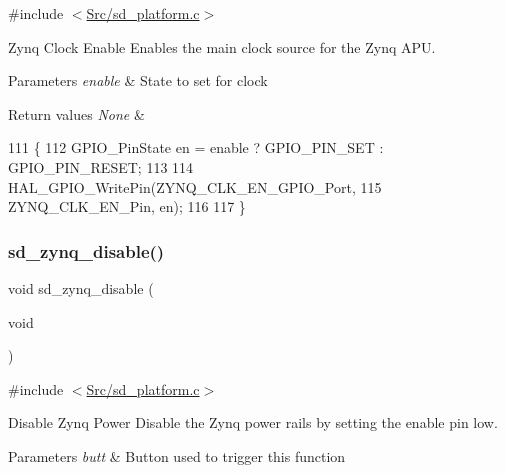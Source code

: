 {\ttfamily \#include $<$\mbox{\hyperlink{sd__platform_8c}{Src/sd\+\_\+platform.\+c}}$>$}



Zynq Clock Enable Enables the main clock source for the Zynq A\+PU. 


\begin{DoxyParams}{Parameters}
{\em enable} & State to set for clock \\
\hline
\end{DoxyParams}

\begin{DoxyRetVals}{Return values}
{\em None} & \\
\hline
\end{DoxyRetVals}

\begin{DoxyCode}
111 \{
112     GPIO\_PinState en = enable ? GPIO\_PIN\_SET : GPIO\_PIN\_RESET;
113     
114     HAL\_GPIO\_WritePin(ZYNQ\_CLK\_EN\_GPIO\_Port, 
115               ZYNQ\_CLK\_EN\_Pin, en);
116 
117 \}
\end{DoxyCode}
\mbox{\label{group___s_d___platform___boot___config_gaaaa432cbbf3382d321107a38a56b9bef}} 
\subsubsection{\texorpdfstring{sd\+\_\+zynq\+\_\+disable()}{sd\_zynq\_disable()}}
{\footnotesize\ttfamily void sd\+\_\+zynq\+\_\+disable (\begin{DoxyParamCaption}\item[{void}]{ }\end{DoxyParamCaption})}



{\ttfamily \#include $<$\mbox{\hyperlink{sd__platform_8c}{Src/sd\+\_\+platform.\+c}}$>$}



Disable Zynq Power Disable the Zynq power rails by setting the enable pin low. 


\begin{DoxyParams}{Parameters}
{\em butt} & Button used to trigger this function \\
\hline
\end{DoxyParams}

